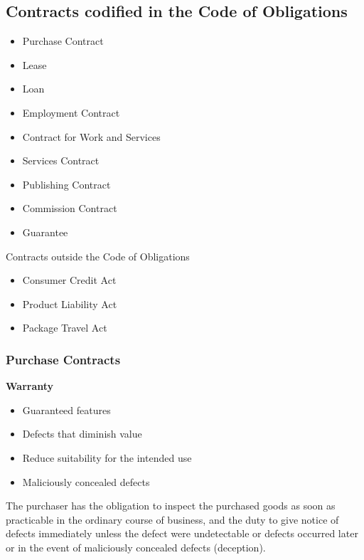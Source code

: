 \documentclass[11pt]{article}
\theoremstyle{definition}
\begin{document}
\subsection{Contracts codified in the Code of Obligations}
\begin{itemize}
	\item Purchase Contract
	\item Lease
	\item Loan
	\item Employment Contract
	\item Contract for Work and Services
	\item Services Contract
	\item Publishing Contract
	\item Commission Contract
	\item Guarantee
\end{itemize}
Contracts outside the Code of Obligations
\begin{itemize}
	\item Consumer Credit Act
	\item Product Liability Act
	\item Package Travel Act
\end{itemize}

\subsubsection{Purchase Contracts}
\textbf{Warranty}
\begin{itemize}
	\item Guaranteed features
	\item Defects that diminish value
	\item Reduce suitability for the intended use
	\item Maliciously concealed defects
\end{itemize}
The purchaser has the obligation to inspect the purchased goods as soon as practicable in the ordinary course of business, and the duty to give notice of defects immediately unless the defect were undetectable or defects occurred later or in the event of maliciously concealed defects (deception).
\end{document}
